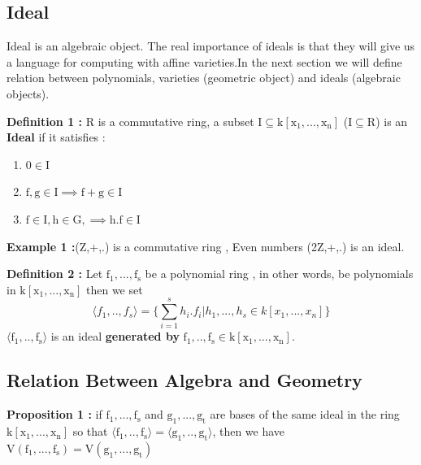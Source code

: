 \documentclass[11pt]{article}
\begin{document}
\subsection{Ideal}
Ideal is an algebraic object. The real importance of ideals is that they will give us a language for computing with affine varieties.In the next section we will define relation between polynomials, varieties (geometric object) and ideals (algebraic objects).\newline

\textbf{Definition 1 :}\newline
R is a commutative ring, a subset $\mathrm{ I \subseteq k[x_1,...,x_n] }$ ($\mathrm{ I \subseteq R }$) is an \textbf{Ideal} if it satisfies :
\begin{enumerate}
\item $\mathrm{0 \in I}$
\item $\mathrm{f,g \in I \implies f+g \in I}$
\item $\mathrm{f \in I, h \in G,\implies h.f \in I  }$
\end{enumerate}

\textbf{Example 1 :}\newline  (Z,+,.) is a commutative ring , Even numbers (2Z,+,.) is an ideal.\newline


\textbf{Definition 2 :}\newline
Let $\mathrm{ f_1,...,f_s }$ be a polynomial ring , in other words, be polynomials in  $\mathrm{ k[x_1,...,x_n] }$  then we set
\begin{equation}
  \langle f_1,..,f_s \rangle=\{ \sum_{i=1}^{s}{h_i.f_i}| h_1,...,h_s \in k[x_1,...,x_n]\}
\end{equation}
$\mathrm{ \langle f_1,..,f_s \rangle  }$ is an ideal \textbf{generated by} $\mathrm{f_1,..,f_s \in k[x_1,...,x_n]}$. \newline


\subsection{Relation Between Algebra and Geometry}

\textbf{Proposition 1 :}\newline
if $\mathrm{ f_1,...,f_s }$ and $\mathrm{ g_1,...,g_t }$ are bases of the same ideal in the ring $\mathrm{k[x_1,...,x_n] }$ so that $\mathrm{ \langle f_1,..,f_s \rangle = \langle g_1,..,g_t \rangle }$, then we have  $\mathrm{V(f_1,...,f_s)=V(g_1,...,g_t) }$ \newline
\end{document}
